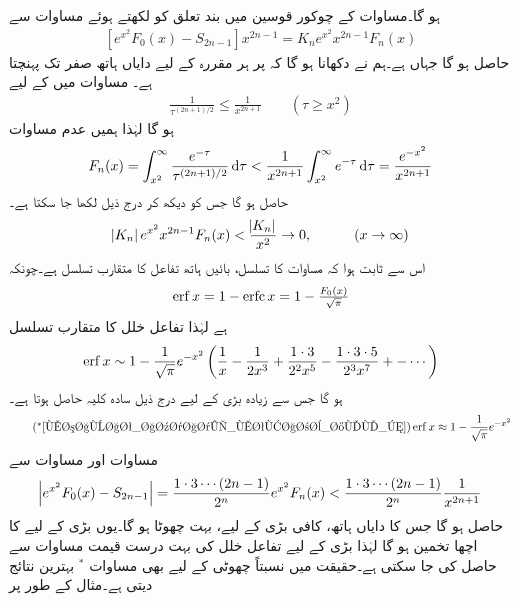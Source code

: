ہو گا۔مساوات  کے چوکور قوسین میں بند تعلق کو  لکھتے ہوئے مساوات  سے
\begin{align}\label{مساوات_اعدادی_متقارب_خلل_ث}
[e^{x^2}F_0(x)-S_{2n-1}]x^{2n-1}=K_ne^{x^2}x^{2n-1}F_n(x)
\end{align}
حاصل ہو گا جہاں  ہے۔ہم نے دکھانا ہو گا کہ  پر ہر مقررہ  کے لیے دایاں ہاتھ صفر تک پہنچتا ہے۔ مساوات  میں  کے لیے
\begin{align*}
\frac{1}{\tau^{(2n+1)/2}}\le \frac{1}{x^{2n+1}} \quad \quad (\tau \ge x^2)
\end{align*} 
ہو گا لہٰذا ہمیں عدم مساوات
\begin{align}\label{مساوات_اعدادی_متقارب_خلل_ج}
F_n(x)=\int_{x^2}^{\infty} \frac{e^{-\tau}}{\tau^{(2n+1)/2}}\dif \tau < \frac{1}{x^{2n+1}}\int_{x^2}^{\infty} e^{-\tau}\dif \tau =\frac{e^{-x^2}}{x^{2n+1}}
\end{align}
 حاصل ہو گا جس کو دیکھ کر درج ذیل لکھا جا سکتا ہے۔
\begin{align*}
\abs{K_n}e^{x^2}x^{2n-1}F_n(x)<\frac{\abs{K_n}}{x^2}\to 0,\quad \quad \quad (x\to \infty)
\end{align*}
اس سے ثابت ہوا کہ مساوات   کا تسلسل، بائیں ہاتھ تفاعل کا متقارب تسلسل ہے۔چونکہ
\begin{align*}
\operatorname{erf} x=1-\operatorname{erfc} x=1-\tfrac{F_0(x)}{\sqrt{\pi}}
\end{align*}
ہے لہٰذا تفاعل خلل کا متقارب تسلسل
\begin{align}\label{مساوات_اعدادی_متقارب_خلل_چ}
\operatorname{erf} x\sim 1-\frac{1}{\sqrt{\pi}} e^{-x^2}\left(\frac{1}{x}-\frac{1}{2x^3}+\frac{1\cdot 3}{2^2x^5}-\frac{1\cdot3\cdot5}{2^3x^7}+-\cdots\right)
\end{align}
ہو گا جس سے زیادہ بڑی  کے لیے درج ذیل سادہ کلیہ حاصل ہوتا ہے۔
\begin{align*}\tag*{(${}^*$\ref{مساوات_اعدادی_متقارب_خلل_چ})}
\erf x \approx 1-\frac{1}{\sqrt{\pi}} e^{-x^2}
\end{align*}
مساوات  اور مساوات  سے
\begin{align*}
\abs{e^{x^2}F_0(x)-S_{2n-1}}=\frac{1\cdot3\cdots (2n-1)}{2^n}e^{x^2}F_n(x)<\frac{1\cdot 3\cdots(2n-1)}{2^n}\frac{1}{x^{2n+1}}
\end{align*}
حاصل ہو گا جس کا دایاں ہاتھ، کافی بڑی  کے لیے، بہت چھوٹا ہو گا۔یوں بڑی  کے لیے  کا اچھا تخمین  ہو گا لہٰذا بڑی  کے لیے تفاعل خلل کی بہت درست قیمت  مساوات  سے حاصل کی جا سکتی ہے۔حقیقت میں نسبتاً چھوٹی  کے لیے بھی مساوات $^*$ بہترین نتائج دیتی ہے۔مثال کے طور پر
